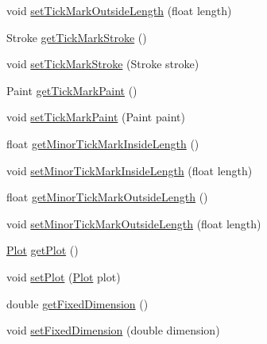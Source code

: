\begin{DoxyCompactItemize}
\item 
void \mbox{\hyperlink{classorg_1_1jfree_1_1chart_1_1axis_1_1_axis_a6a52712e5ddf81c046eac2f1b4894576}{set\+Tick\+Mark\+Outside\+Length}} (float length)
\item 
Stroke \mbox{\hyperlink{classorg_1_1jfree_1_1chart_1_1axis_1_1_axis_a2d8786d95acfa7706629df7e96b2a2b1}{get\+Tick\+Mark\+Stroke}} ()
\item 
void \mbox{\hyperlink{classorg_1_1jfree_1_1chart_1_1axis_1_1_axis_a119d5db3e19f77358279223fe3811c21}{set\+Tick\+Mark\+Stroke}} (Stroke stroke)
\item 
Paint \mbox{\hyperlink{classorg_1_1jfree_1_1chart_1_1axis_1_1_axis_a705a68f5e9e714df67c98dd2b24337e8}{get\+Tick\+Mark\+Paint}} ()
\item 
void \mbox{\hyperlink{classorg_1_1jfree_1_1chart_1_1axis_1_1_axis_a1608c6dd5ac66a80306a06faa4b65905}{set\+Tick\+Mark\+Paint}} (Paint paint)
\item 
float \mbox{\hyperlink{classorg_1_1jfree_1_1chart_1_1axis_1_1_axis_a99f2ec9bc2d5fb31247c7c6194ed5402}{get\+Minor\+Tick\+Mark\+Inside\+Length}} ()
\item 
void \mbox{\hyperlink{classorg_1_1jfree_1_1chart_1_1axis_1_1_axis_ab0f964e867920549fe0330bd94a6c0e2}{set\+Minor\+Tick\+Mark\+Inside\+Length}} (float length)
\item 
float \mbox{\hyperlink{classorg_1_1jfree_1_1chart_1_1axis_1_1_axis_a0649fc67995cee80610a7b344fc84b76}{get\+Minor\+Tick\+Mark\+Outside\+Length}} ()
\item 
void \mbox{\hyperlink{classorg_1_1jfree_1_1chart_1_1axis_1_1_axis_a9c16bacaf75deb9b448085e067652426}{set\+Minor\+Tick\+Mark\+Outside\+Length}} (float length)
\item 
\mbox{\hyperlink{classorg_1_1jfree_1_1chart_1_1plot_1_1_plot}{Plot}} \mbox{\hyperlink{classorg_1_1jfree_1_1chart_1_1axis_1_1_axis_a974e4dab4db47f7d25c7ef8ef8b20c6e}{get\+Plot}} ()
\item 
void \mbox{\hyperlink{classorg_1_1jfree_1_1chart_1_1axis_1_1_axis_aef0fc147d7e44ccf2c020e223c6c34ca}{set\+Plot}} (\mbox{\hyperlink{classorg_1_1jfree_1_1chart_1_1plot_1_1_plot}{Plot}} plot)
\item 
double \mbox{\hyperlink{classorg_1_1jfree_1_1chart_1_1axis_1_1_axis_ae89f36379d8e1a4cd95fe6acc39de039}{get\+Fixed\+Dimension}} ()
\item 
void \mbox{\hyperlink{classorg_1_1jfree_1_1chart_1_1axis_1_1_axis_a1ab0c12e26c2468049d25e635988beec}{set\+Fixed\+Dimension}} (double dimension)
\item 

\end{DoxyCompactItemize}
